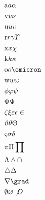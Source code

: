 \begin{align}
	&\mathrm{a} a \alpha \\
	&\mathrm{v} v \nu \\
	&\mathrm{u} u \upsilon \\
	&\mathrm{r} r \gamma \varUpsilon  \\
	&\mathrm{x} x \chi \\
	&\mathrm{k} k \kappa \\
	&\mathrm{o} o \omicron \\
	&\mathrm{w} w \omega \\
	&\phi \varphi \psi \\
	&\Phi \Psi \\
	&\zeta \xi \varepsilon \epsilon \in \\
	&\vartheta \theta \Theta \\
	&\varsigma \sigma \delta \\
	&\pi \Pi \prod \\
	&\Lambda \wedge \cap \\
	&\triangle \Delta \\
	&\nabla \grad \\
	&\emptyset \varnothing \not O \\
\end{align}